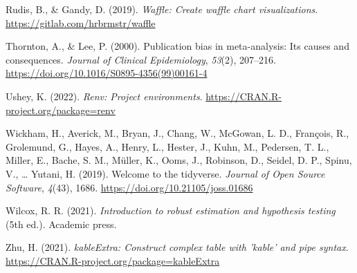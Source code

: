 \documentclass[
  man, donotrepeattitle,mask,floatsintext]{apa7}
\newlength{\cslhangindent}
\newlength{\cslentryspacingunit} %
\newenvironment{CSLReferences}[2] %
 {%
  \setlength{\parindent}{0pt}
  \ifodd #1
  \let\oldpar\par
  \def\par{\hangindent=\cslhangindent\oldpar}
  \fi
  \setlength{\parskip}{#2\cslentryspacingunit}
 }%
 {}
\begin{document}
\begin{CSLReferences}{1}{0}
\leavevmode{}%
Rudis, B., \& Gandy, D. (2019). \emph{Waffle: Create waffle chart visualizations}. \url{https://gitlab.com/hrbrmstr/waffle}

\leavevmode{}%
Thornton, A., \& Lee, P. (2000). Publication bias in meta-analysis: Its causes and consequences. \emph{Journal of Clinical Epidemiology}, \emph{53}(2), 207--216. \url{https://doi.org/10.1016/S0895-4356(99)00161-4}

\leavevmode{}%
Ushey, K. (2022). \emph{Renv: Project environments}. \url{https://CRAN.R-project.org/package=renv}

\leavevmode{}%
Wickham, H., Averick, M., Bryan, J., Chang, W., McGowan, L. D., François, R., Grolemund, G., Hayes, A., Henry, L., Hester, J., Kuhn, M., Pedersen, T. L., Miller, E., Bache, S. M., Müller, K., Ooms, J., Robinson, D., Seidel, D. P., Spinu, V., \ldots{} Yutani, H. (2019). Welcome to the {tidyverse}. \emph{Journal of Open Source Software}, \emph{4}(43), 1686. \url{https://doi.org/10.21105/joss.01686}

\leavevmode{}%
Wilcox, R. R. (2021). \emph{Introduction to robust estimation and hypothesis testing} (5th ed.). Academic press.

\leavevmode{}%
Zhu, H. (2021). \emph{kableExtra: Construct complex table with 'kable' and pipe syntax}. \url{https://CRAN.R-project.org/package=kableExtra}

\end{CSLReferences}
\end{document}
